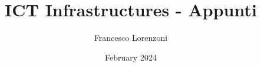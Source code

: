 
\setcounter{secnumdepth}{4}
\setcounter{tocdepth}{4}

\title{ICT Infrastructures - Appunti}
\author{Francesco Lorenzoni}
\date{February 2024}



\maketitle
\tableofcontents



















